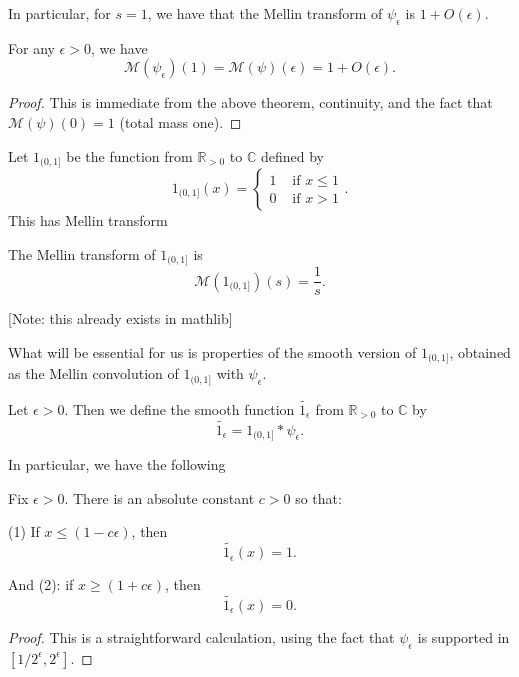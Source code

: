 In particular, for $s=1$, we have that the Mellin transform of $\psi_\epsilon$ is $1+O(\epsilon)$.
\begin{corollary}\label{MellinOfDeltaSpikeAt1}
For any $\epsilon>0$, we have
$$\mathcal{M}(\psi_\epsilon)(1) =
\mathcal{M}(\psi)(\epsilon)= 1+O(\epsilon).$$
\end{corollary}



\begin{proof}
This is immediate from the above theorem, continuity, and the fact that $\mathcal{M}(\psi)(0)=1$ (total mass one).
\end{proof}



Let $1_{(0,1]}$ be the function from $\mathbb{R}_{>0}$ to $\mathbb{C}$ defined by
$$1_{(0,1]}(x) = \begin{cases}
1 & \text{ if }x\leq 1\\
0 & \text{ if }x>1
\end{cases}.$$
This has Mellin transform
\begin{theorem}\label{MellinOf1}
The Mellin transform of $1_{(0,1]}$ is
$$\mathcal{M}(1_{(0,1]})(s) = \frac{1}{s}.$$
\end{theorem}
[Note: this already exists in mathlib]



What will be essential for us is properties of the smooth version of $1_{(0,1]}$, obtained as the
 Mellin convolution of $1_{(0,1]}$ with $\psi_\epsilon$.
\begin{definition}\label{Smooth1}
Let $\epsilon>0$. Then we define the smooth function $\widetilde{1_{\epsilon}}$ from $\mathbb{R}_{>0}$ to $\mathbb{C}$ by
$$\widetilde{1_{\epsilon}} = 1_{(0,1]}\ast\psi_\epsilon.$$
\end{definition}



In particular, we have the following
\begin{lemma}\label{Smooth1Properties}
Fix $\epsilon>0$. There is an absolute constant $c>0$ so that:

(1) If $x\leq (1-c\epsilon)$, then
$$\widetilde{1_{\epsilon}}(x) = 1.$$

And (2):
if $x\geq (1+c\epsilon)$, then
$$\widetilde{1_{\epsilon}}(x) = 0.$$
\end{lemma}



\begin{proof}
This is a straightforward calculation, using the fact that $\psi_\epsilon$ is supported in $[1/2^\epsilon,2^\epsilon]$.
\end{proof}



